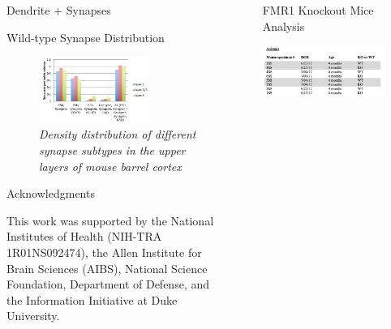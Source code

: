 \documentclass[final, table]{beamer}
\newlength{\sepwid}
\newlength{\onecolwid}
\newlength{\twocolwid}
\begin{document}
\begin{frame}[t]
\begin{columns}[t]
\begin{column}{\twocolwid}
\begin{columns}[t]
\begin{column}{\onecolwid}
\begin{block}{Dendrite + Synapses}
\end{block}

\begin{block}{Wild-type Synapse Distribution} 
\begin{figure}
\centering
\includegraphics[width=0.7\textwidth]{figs/wildtype_synapse_counts}
\caption{\textit{Density distribution of different synapse subtypes in the upper layers of mouse barrel cortex}}
\end{figure}


\end{block} 

\begin{block}{Acknowledgments} 

\tiny{This work was supported by the National Institutes of Health (NIH-TRA 1R01NS092474), the Allen Institute for Brain Sciences (AIBS), National Science Foundation, Department of Defense, and the Information Initiative at Duke University.}
\end{block} 



\end{column}

\end{columns} 

\end{column} 

\begin{column}{\sepwid}\end{column}  %
\begin{column}{\onecolwid}

\begin{block}{FMR1 Knockout Mice Analysis} 



\begin{table}
\centering
\includegraphics[width=0.8\textwidth]{figs/animal_table}
\caption{\textit{Mice used for this experiment}.  }
\end{table}


\end{block}
\end{column}
\end{columns}
\end{frame}
\end{document}
